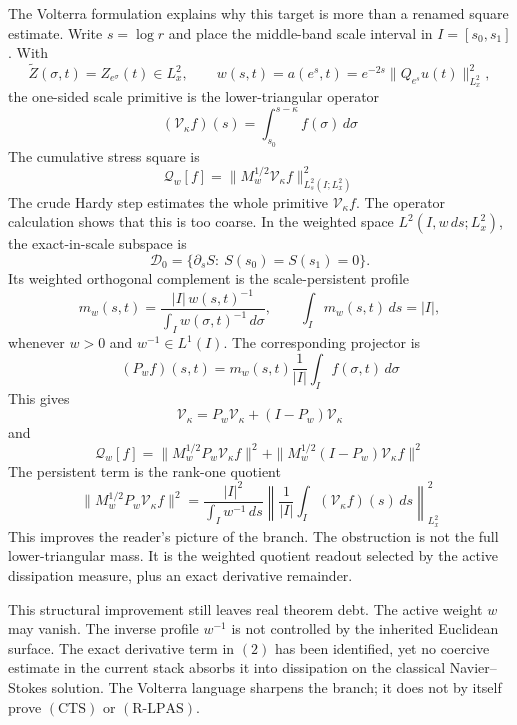 The Volterra formulation explains why this target is more than a renamed
square estimate.  Write \(s=\log r\) and place the middle-band scale interval
in \(I=[s_0,s_1]\).  With
\[
  \widetilde Z(\sigma,t)=Z_{e^\sigma}(t)\in L^2_x,
  \qquad
  w(s,t)=a(e^s,t)
  =
  e^{-2s}\|Q_{e^s}u(t)\|_{L^2_x}^2,
\]
the one-sided scale primitive is the lower-triangular operator
\[
  (\mathcal V_\kappa f)(s)
  =
  \int_{s_0}^{s-\kappa}f(\sigma)\,d\sigma
\]
The cumulative stress square is
\[
  \mathcal Q_w[f]
  =
  \|M_w^{1/2}\mathcal V_\kappa f\|_{L^2_s(I;L^2_x)}^2
\]
The crude Hardy step estimates the whole primitive
\(\mathcal V_\kappa f\).  The operator calculation shows that this is too
coarse.  In the weighted space \(L^2(I,w\,ds;L^2_x)\), the exact-in-scale
subspace is
\[
  \mathcal D_0
  =
  \{\partial_s S:\ S(s_0)=S(s_1)=0\}.
\]
Its weighted orthogonal complement is the scale-persistent profile
\[
  m_w(s,t)
  =
  \frac{|I|\,w(s,t)^{-1}}{\int_I w(\sigma,t)^{-1}\,d\sigma},
  \qquad
  \int_I m_w(s,t)\,ds=|I|,
\]
whenever \(w>0\) and \(w^{-1}\in L^1(I)\).  The corresponding projector is
\[
  (P_w f)(s,t)
  =
  m_w(s,t)\frac{1}{|I|}\int_I f(\sigma,t)\,d\sigma
\]
This gives
\[
  \mathcal V_\kappa
  =
  P_w\mathcal V_\kappa+(I-P_w)\mathcal V_\kappa
\]
and
\[
  \mathcal Q_w[f]
  =
  \|M_w^{1/2}P_w\mathcal V_\kappa f\|^2
  +
  \|M_w^{1/2}(I-P_w)\mathcal V_\kappa f\|^2
  \tag{2}
\]
The persistent term is the rank-one quotient
\[
  \|M_w^{1/2}P_w\mathcal V_\kappa f\|^2
  =
  \frac{|I|^2}{\int_I w^{-1}\,ds}
  \left\|
  \frac{1}{|I|}\int_I(\mathcal V_\kappa f)(s)\,ds
  \right\|_{L^2_x}^2
  \tag{3}
\]
This improves the reader's picture of the branch.  The obstruction is not
the full lower-triangular mass.  It is the weighted quotient readout selected
by the active dissipation measure, plus an exact derivative remainder.

This structural improvement still leaves real theorem debt.  The active
weight \(w\) may vanish.  The inverse profile \(w^{-1}\) is not controlled by
the inherited Euclidean surface.  The exact derivative term in \((2)\) has
been identified, yet no coercive estimate in the current stack absorbs it
into dissipation on the classical Navier--Stokes solution.  The Volterra
language sharpens the branch; it does not by itself prove \((\mathrm{CTS})\)
or \((\mathrm{R\text{-}LPAS})\).

